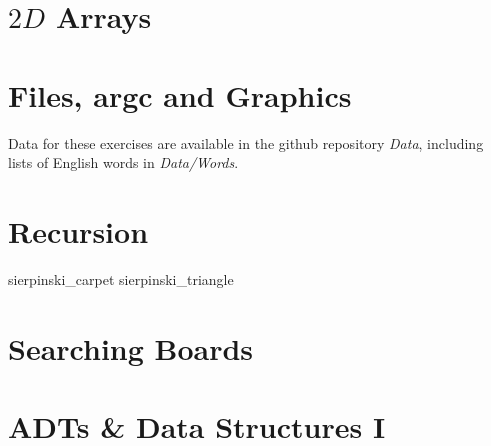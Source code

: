 \chapter{$2D$ Arrays}

\nopartorder










\chapter{Files, argc and Graphics}

Data for these exercises are available in the github repository {\em
Data}, including lists of English words in {\em Data/Words}.








\setcounter{chapter}{6}
\chapter{Recursion}






 {sierpinski_carpet}
 {sierpinski_triangle}

%

\chapter{Searching Boards}









\chapter{ADTs \& Data Structures I}

